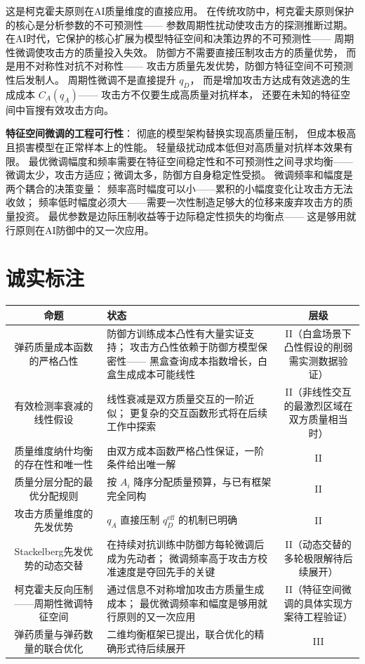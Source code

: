\documentclass[11pt,a4paper]{article}
\begin{document}
这是柯克霍夫原则在AI质量维度的直接应用。
在传统攻防中，柯克霍夫原则保护的核心是分析参数的不可预测性——
参数周期性扰动使攻击方的探测推断过期。
在AI时代，它保护的核心扩展为模型特征空间和决策边界的不可预测性——
周期性微调使攻击方的质量投入失效。
防御方不需要直接压制攻击方的质量优势，
而是用不对称性对抗不对称性——
攻击方质量先发优势，防御方特征空间不可预测性后发制人。
周期性微调不是直接提升 \(q_D\)，
而是增加攻击方达成有效逃逸的生成成本 \(C_A(q_A)\)——
攻击方不仅要生成高质量对抗样本，
还要在未知的特征空间中盲搜有效攻击方向。

\textbf{特征空间微调的工程可行性}：
彻底的模型架构替换实现高质量压制，
但成本极高且损害模型在正常样本上的性能。
轻量级扰动成本低但对高质量对抗样本效果有限。
最优微调幅度和频率需要在特征空间稳定性和不可预测性之间寻求均衡——
微调太少，攻击方适应；微调太多，防御方自身稳定性受损。
微调频率和幅度是两个耦合的决策变量：
频率高时幅度可以小——累积的小幅度变化让攻击方无法收敛；
频率低时幅度必须大——需要一次性制造足够大的位移来废弃攻击方的质量投资。
最优参数是边际压制收益等于边际稳定性损失的均衡点——
这是够用就行原则在AI防御中的又一次应用。

\section{诚实标注}

\begin{center}
\begin{xltabular}{\textwidth}{c|X|c}
\toprule
\textbf{命题} & \textbf{状态} & \textbf{层级} \\
\midrule
弹药质量成本函数的严格凸性 &
防御方训练成本凸性有大量实证支持；
攻击方凸性依赖于防御方模型保密性——
黑盒查询成本指数增长，白盒生成成本可能线性 &
II（白盒场景下凸性假设的削弱需实测数据验证） \\
有效检测率衰减的线性假设 &
线性衰减是双方质量交互的一阶近似；
更复杂的交互函数形式将在后续工作中探索 &
II（非线性交互的最激烈区域在双方质量相当时） \\
质量维度纳什均衡的存在性和唯一性 &
由双方成本函数严格凸性保证，一阶条件给出唯一解 &
II \\
质量分层分配的最优分配规则 &
按 \(A_i\) 降序分配质量预算，与已有框架完全同构 &
II \\
攻击方质量维度的先发优势 &
\(q_A\) 直接压制 \(q_D^{\text{eff}}\) 的机制已明确 &
II \\
Stackelberg先发优势的动态交替 &
在持续对抗训练中防御方每轮微调后成为先动者；
微调频率高于攻击方校准速度是夺回先手的关键 &
II（动态交替的多轮极限解待后续展开） \\
柯克霍夫反向压制——周期性微调特征空间 &
通过信息不对称增加攻击方质量生成成本；
最优微调频率和幅度是够用就行原则的又一次应用 &
II（特征空间微调的具体实现方案待工程验证） \\
弹药质量与弹药数量的联合优化 &
二维均衡框架已提出，联合优化的精确形式待后续展开 &
III \\
\bottomrule
\end{xltabular}
\end{center}
\end{document}
